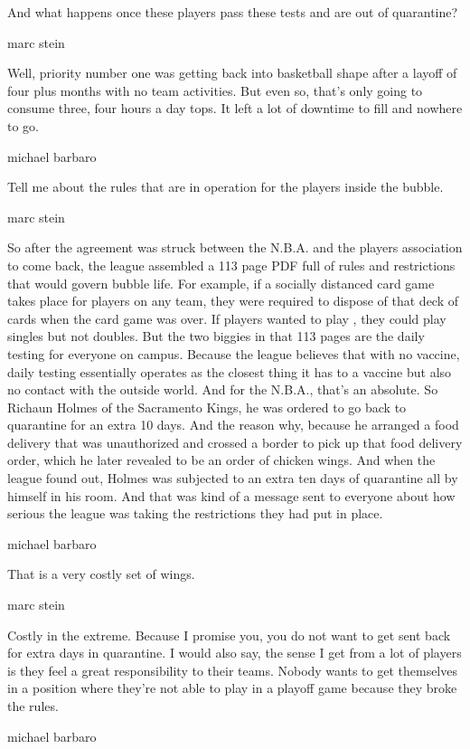 And what happens once these players pass these tests and are out of
quarantine?

marc stein

Well, priority number one was getting back into basketball shape after a
layoff of four plus months with no team activities. But even so, that's
only going to consume three, four hours a day tops. It left a lot of
downtime to fill and nowhere to go.

michael barbaro

Tell me about the rules that are in operation for the players inside the
bubble.

marc stein

So after the agreement was struck between the N.B.A. and the players
association to come back, the league assembled a 113 page PDF full of
rules and restrictions that would govern bubble life. For example, if a
socially distanced card game takes place for players on any team, they
were required to dispose of that deck of cards when the card game was
over. If players wanted to play , they could play singles but not
doubles. But the two biggies in that 113 pages are the daily testing for
everyone on campus. Because the league believes that with no vaccine,
daily testing essentially operates as the closest thing it has to a
vaccine but also no contact with the outside world. And for the N.B.A.,
that's an absolute. So Richaun Holmes of the Sacramento Kings, he was
ordered to go back to quarantine for an extra 10 days. And the reason
why, because he arranged a food delivery that was unauthorized and
crossed a border to pick up that food delivery order, which he later
revealed to be an order of chicken wings. And when the league found out,
Holmes was subjected to an extra ten days of quarantine all by himself
in his room. And that was kind of a message sent to everyone about how
serious the league was taking the restrictions they had put in place.

michael barbaro

That is a very costly set of wings.

marc stein

Costly in the extreme. Because I promise you, you do not want to get
sent back for extra days in quarantine. I would also say, the sense I
get from a lot of players is they feel a great responsibility to their
teams. Nobody wants to get themselves in a position where they're not
able to play in a playoff game because they broke the rules.

michael barbaro

